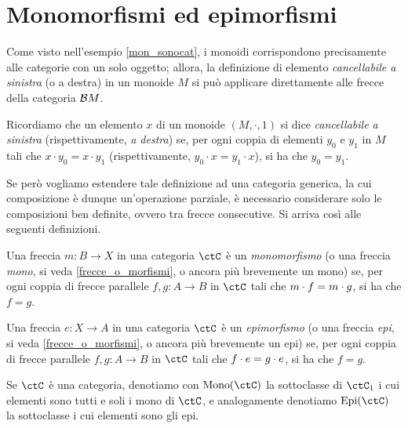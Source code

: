 \section{Monomorfismi ed epimorfismi}\label{sec_monoepi}

Come visto nell'esempio \ref{mon_sonocat}, i monoidi corrispondono precisamente alle categorie con un solo oggetto; allora,
la definizione di elemento \emph{cancellabile a sinistra} (o a destra) in un monoide \(M\) si può applicare direttamente alle frecce della categoria \(\mathcal{B} M\).
\begin{definition}\label{def_elem_cancel}
 Ricordiamo che un elemento \(x\) di un mo\-no\-i\-de \((M, \cdot, 1)\) si dice \emph{cancellabile a sinistra} (rispettivamente, \emph{a destra}) se,	per ogni coppia di elementi \(y_0\) e \(y_1\) in \(M\) tali che \(x \cdot y_0 = x \cdot y_1\) (rispettivamente, \(y_0 \cdot x = y_1 \cdot x\)), si ha che \(y_0 = y_1\).
\end{definition}
Se però vogliamo estendere tale definizione ad una categoria generica, la cui composizione è dunque un'operazione parziale, è necessario considerare solo le composizioni ben definite, ovvero tra frecce consecutive. Si arriva così alle seguenti definizioni.
\begin{definition}[Monomorfismo]\label{def_Mono}
 Una freccia \(m \colon B \to X\) in una categoria \(\ctC\) è un \emph{monomorfismo} (o una freccia \emph{mono}, si veda \ref{frecce_o_morfismi}, o ancora più brevemente un mono) se,	per ogni coppia di frecce parallele \(f, g \colon A \to B\) in \(\ctC\) tali che \(m \cdot f = m \cdot g\), si ha che \(f = g\).
\end{definition}
\begin{definition}[Epimorfismo]\label{def_Epi}
 Una freccia \(e \colon X \to A\) in una categoria \(\ctC\) è un \emph{epimorfismo} (o una freccia \emph{epi}, si veda \ref{frecce_o_morfismi}, o ancora più brevemente un epi) se,	per ogni coppia di frecce parallele \(f, g \colon A \to B\) in \(\ctC\) tali che \(f \cdot e = g \cdot e\), si ha che \(f = g\).
\end{definition}
\begin{notation}\label{notaz_monoC_epiC}
 Se \(\ctC\) è una categoria, denotiamo con \(\Mono[\ctC]\) la sottoclasse di \(\ctC_1\) i cui elementi sono tutti e soli i mono di \(\ctC\), e analogamente denotiamo \(\Epi[\ctC]\) la sottoclasse i cui elementi sono gli epi.
\end{notation}
